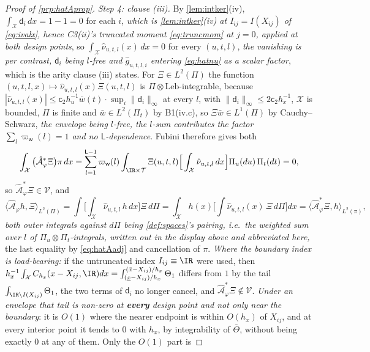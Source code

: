 \begin{proof}[Proof of \cref{prp:hatAprop}]
\emph{Step 4: clause (iii).} By \cref{lem:intker}(iv), $\int_{\mathcal X}\mathsf d_i\,dx=1-1=0$
for each $i$, \emph{which is \cref{lem:intker}(iv) at $I_{ij}=I(X_{ij})$ of \eqref{eq:ivalx}, hence C3(ii)'s
truncated moment \eqref{eq:truncmom} at $j=0$, applied at both design points}, so
$\int_{\mathcal X}\hat\nu_{u,t,l}(x)\,dx=0$ for every $(u,t,l)$, \emph{the vanishing is per contrast,
$\mathsf d_i$ being $l$-free and $\hat g_{u,t,l,i}$ entering \eqref{eq:hatnu} as a scalar factor}, which
is the arity clause \textup{(iii)} states. For $\Xi\in L^{2}(\Pi)$
the function $(u,t,l,x)\mapsto\hat\nu_{u,t,l}(x)\Xi(u,t,l)$ is $\Pi\otimes\mathrm{Leb}$-integrable, because
$|\hat\nu_{u,t,l}(x)|\le\mathsf c_2h_u^{-1}\bar w(t)\cdot\sup_i\|\mathsf d_i\|_\infty$ at every $l$, with
$\|\mathsf d_i\|_\infty\le2\mathsf c_2h_x^{-1}$, $\mathcal X$ is bounded, $\Pi$ is finite and
$\bar w\in L^{2}(\Pi_t)$ by B1(iv.c), so $\Xi\bar w\in L^{1}(\Pi)$ by Cauchy--Schwarz, \emph{the
envelope being $l$-free, the $l$-sum contributes the factor $\sum_l\varpi_{\mathsf w}(l)=1$ and no
$\mathsf L$-dependence}. Fubini
therefore gives both
\[
\int_{\mathcal X}\big(\hat{\mathcal A}^\ast_\varphi\Xi\big)\pi\,dx
=\sum_{l=1}^{\mathsf L-1}\varpi_{\mathsf w}(l)\int_{\IR\times\mathcal T}\Xi(u,t,l)
\Big[\int_{\mathcal X}\hat\nu_{u,t,l}\,dx\Big]\Pi_u(du)\,\Pi_t(dt)=0 ,
\]
so $\hat{\mathcal A}^\ast_\varphi\Xi\in\mathcal V$, and
\[
\big\langle\hat{\mathcal A}_\varphi h,\Xi\big\rangle_{L^{2}(\Pi)}
=\int\!\!\Big[\int_{\mathcal X}\hat\nu_{u,t,l}\,h\,dx\Big]\Xi\,d\Pi
=\int_{\mathcal X}h(x)\Big[\int\hat\nu_{u,t,l}(x)\,\Xi\,d\Pi\Big]dx
=\big\langle\hat{\mathcal A}^\ast_\varphi\Xi,h\big\rangle_{L^{2}(\pi)},
\]
\emph{both outer integrals against $d\Pi$ being \cref{def:spaces}'s pairing, i.e.\ the weighted sum over
$l$ of $\Pi_u\otimes\Pi_t$-integrals, written out in the display above and abbreviated here,}
the last equality by \eqref{eq:hatAadj} and cancellation of $\pi$. \emph{Where the boundary index is
load-bearing:} if the untruncated index $I_{ij}\equiv\IR$ were used, then
$h_x^{-1}\int_{\mathcal X}C_{h_x}(x-X_{ij},\IR)dx=\int_{(\underline x-X_{ij})/h_x}^{(\bar x-X_{ij})/h_x}\Theta_1$
differs from $1$ by the tail $\int_{\IR\setminus I(X_{ij})}\Theta_1$, the two terms of $\mathsf d_i$ no
longer cancel, and $\hat{\mathcal A}^\ast_\varphi\Xi\notin\mathcal V$. \emph{Under an envelope that tail
is non-zero at \textbf{every} design point and not only near the boundary}: it is $O(1)$ where the nearer
endpoint is within $O(h_x)$ of $X_{ij}$, and at every interior point it tends to $0$ with $h_x$, by
integrability of $\bar\Theta$, without being exactly $0$ at any of them. Only the \emph{$O(1)$} part is

\end{proof}

